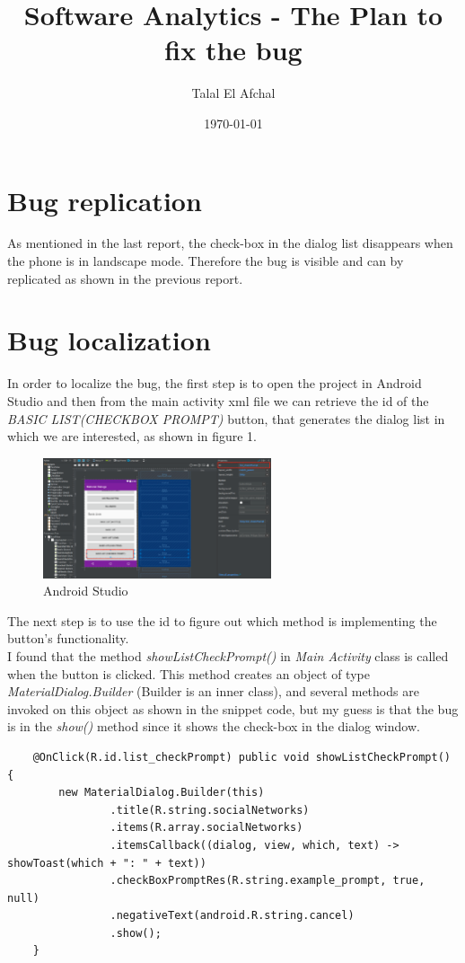 \documentclass[12pt]{report}
\begin{document}
\title{Software Analytics - The Plan to fix the bug}
\author{Talal El Afchal}
\date{\today}
\maketitle

\section*{Bug replication}
	As mentioned in the last report, the check-box in the dialog list disappears when the phone is in landscape mode. Therefore the bug is visible and can by replicated as shown in the previous report.


\section*{Bug localization}
	In order to localize the bug, the first step is to open the project in Android Studio and then from the main activity xml file we can retrieve the id of the \emph{BASIC LIST(CHECKBOX PROMPT)} button, that generates the dialog list in which we are interested, as shown in figure 1.
\begin{figure}[H]
	\centering
	\includegraphics[width=0.6\textwidth]{screenshots/id.png}
	\caption{Android Studio}
\end{figure}
	The next step is to use the id to figure out which method is implementing the button's functionality.\\ 
	I found that the method \emph{showListCheckPrompt()} in \emph{Main Activity} class is called when the button is clicked. This method creates an object of type \emph{MaterialDialog.Builder} (Builder is an inner class), and several methods are invoked on this object as shown in the snippet code, but my guess is that the bug is in the \emph{show()} method since it shows the check-box in the dialog window.

	\begin{lstlisting}
    @OnClick(R.id.list_checkPrompt) public void showListCheckPrompt() {
        new MaterialDialog.Builder(this)
                .title(R.string.socialNetworks)
                .items(R.array.socialNetworks)
                .itemsCallback((dialog, view, which, text) -> showToast(which + ": " + text))
                .checkBoxPromptRes(R.string.example_prompt, true, null)
                .negativeText(android.R.string.cancel)
                .show();
    }
\end{lstlisting}
\end{document}
